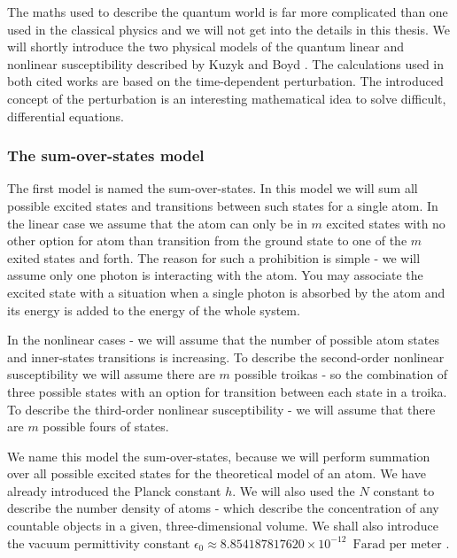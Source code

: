 \documentclass[12pt,twoside,a4paper]{article}
\numberwithin{equation}{subsection}
\numberwithin{figure}{subsection}
\begin{document}
The maths used to describe the quantum world is far more complicated than one used in the classical physics and we will not get into the
details in this thesis. We will shortly introduce the two physical models of the quantum linear and nonlinear susceptibility described by
Kuzyk \cite{kuzyk_nlo} and Boyd \cite{boyd_nlo}. The calculations used in both cited works are based on the time-dependent perturbation.
The introduced concept of the perturbation is an interesting mathematical idea to solve difficult, differential equations.

\subsubsection*{The sum-over-states model}

The first model is named the sum-over-states. In this model we will sum all possible excited states and transitions between such states for
a single atom. In the linear case we assume that the atom can only be in $m$ excited states with no other option for atom than transition from
the ground state to one of the $m$ exited states and forth. The reason for such a prohibition is simple - we will assume only one photon is
interacting with the atom. You may associate the excited state with a situation when a single photon is absorbed by the atom and its energy
is added to the energy of the whole system.

In the nonlinear cases - we will assume that the number of possible atom states and inner-states transitions is increasing. To describe the
second-order nonlinear susceptibility we will assume there are $m$ possible troikas - so the combination of three possible states with an
option for transition between each state in a troika. To describe the third-order nonlinear susceptibility - we will assume that there
are $m$ possible fours of states.

We name this model the sum-over-states, because we will perform summation over all possible excited states for the theoretical model of an
atom. We have already introduced the Planck constant $h$. We will also used the $N$ constant to describe the number density of atoms - which
describe the concentration of any countable objects in a given, three-dimensional volume. We shall also introduce the vacuum permittivity constant
$\epsilon_0 \approx 8.854187817620 \times 10^{-12} \, \text{ Farad per meter } $. 
\end{document}
